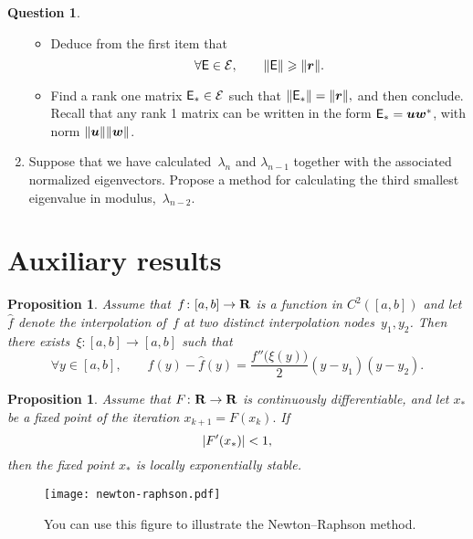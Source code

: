 \documentclass[11pt]{article}
\theoremstyle{definition}
\newtheorem{question}{Question}
\theoremstyle{remark}
\theoremstyle{plain}%
\newtheorem{proposition}[theorem]{Proposition}
\begin{document}
\begin{question}
\begin{enumerate}
\begin{itemize}
                \item
                    Deduce from the first item that
                    \[
                        \forall \mathsf E \in \mathcal E, \qquad
                        \lVert\mathsf E\rVert \geqslant \lVert\mathbf{\boldsymbol{r}}\rVert.
                    \]

                \item
                    Find a rank one matrix $\mathsf E_* \in \mathcal E$ such that
                    \(
                    \lVert\mathsf E_*\rVert = \lVert\mathbf{\boldsymbol{r}}\rVert,
                    \)
                    and then conclude.
                    Recall that any rank 1 matrix can be written in the form $\mathsf E_* = \mathbf{\boldsymbol{u}} \mathbf{\boldsymbol{w}}^*$,
                    with norm $\lVert\mathbf{\boldsymbol{u}}\rVert \lVert\mathbf{\boldsymbol{w}}\rVert$.
            \end{itemize}

        \item
            Suppose that we have calculated~$\lambda_n$ and $\lambda_{n-1}$ together with the associated normalized eigenvectors.
            Propose a method for calculating the third smallest eigenvalue in modulus,~$\lambda_{n-2}$.
    \end{enumerate}
\end{question}



\newpage

\section*{Auxiliary results}
\begin{proposition}
    \label{proposition:interpolation_error}
    Assume that~$f\colon [a, b] \to \mathbf R$ is a function in $C^{2}([a, b])$ and let $\widehat f$ denote
    the interpolation of~$f$ at two distinct interpolation nodes~$y_1, y_2$.
    Then there exists~$\xi\colon [a, b] \to [a, b]$ such that
    \[
        \forall y \in [a, b], \qquad
        f(y) - \widehat f(y) = \frac{f''\bigl(\xi(y)\bigr)}{2} (y-y_1) (y - y_2).
    \]
\end{proposition}

\begin{proposition}
    \label{proposition:local_convergence}
    Assume that $F\colon \mathbf R \to \mathbf R$ is continuously differentiable,
    and let $x_*$ be a fixed point of the iteration
    \(
        x_{k+1} = F(x_k).
    \)
    If
    \[
        \lvert F'(x_*)\rvert < 1,
    \]
    then the fixed point $x_*$ is locally exponentially stable.
\end{proposition}

\begin{figure}[ht]
    \centering
    \texttt{[image: newton-raphson.pdf]}
    \caption{You can use this figure to illustrate the Newton--Raphson method.}%
    \label{fig:nr}
\end{figure}
\end{document}
